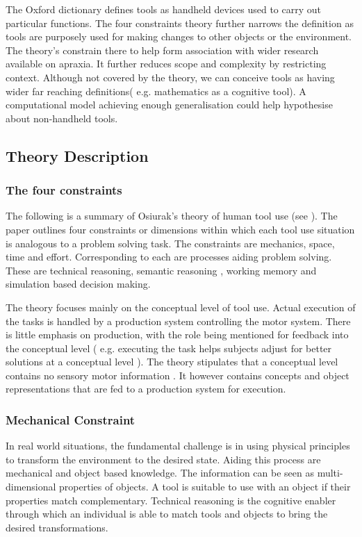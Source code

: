 \documentclass[11]{article}
\begin{document}
The Oxford dictionary defines tools as handheld devices used to carry out particular functions. The four constraints theory further narrows the definition as tools are purposely used for making changes to other objects or the environment. The theory's constrain there to help form association with wider research available on apraxia. It further reduces scope and complexity by restricting context. Although not covered by the theory, we can conceive tools as having wider far reaching definitions( e.g. mathematics as a cognitive tool). A computational model achieving enough generalisation could help hypothesise about non-handheld tools.

\subsection*{Theory Description}
\subsubsection*{The four constraints}
The following is a summary of Osiurak's theory of human tool use (see \cite{osiurak2014}). 
The paper outlines four constraints or dimensions within which each tool use situation is analogous to a problem solving task. The constraints are mechanics, space, time and effort. 
Corresponding to each are processes aiding problem solving. These are technical reasoning, semantic reasoning , working memory and simulation based decision making. 

The theory focuses mainly on the conceptual level of tool use. Actual execution of the tasks is handled by a production system controlling the motor system. There is little emphasis on production, with the role being mentioned for feedback into the conceptual level ( e.g. executing the task helps subjects adjust for better solutions at a conceptual level ). The theory stipulates that a conceptual level contains no sensory motor information . It however contains concepts and object representations that are fed to a production system for execution.

\subsubsection*{Mechanical Constraint}
In real world situations, the fundamental challenge is in using physical principles to transform the environment to the desired state. Aiding this process are mechanical and object based knowledge. The information can be seen as multi-dimensional properties of objects. A tool is suitable to use with an object if their properties match complementary. Technical reasoning is the cognitive enabler through which an individual is able to match tools and objects to bring the desired transformations.
\end{document}
